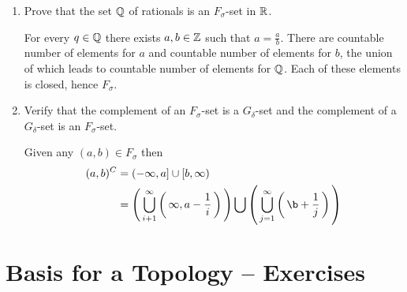 \documentclass[10pt,a4paper]{report}
\begin{document}
\begin{enumerate}
\begin{enumerate}[label=(\roman*)]
	\item Prove that the set $\mathbb{Q}$ of rationals is an $F_\sigma$-set in $\mathbb{R}$.  
	
	For every $q \in \mathbb{Q}$ there exists $a,b \in \mathbb{Z}$ such that $a = \frac{a}{b}$.  There are countable number of elements for $a$ and countable number of elements for $b$, the union of which leads to countable number of elements for $\mathbb{Q}$.  Each of these elements is closed, hence $F_\sigma$.
	
	\item Verify that the complement of an $F_\sigma$-set is a $G_\delta$-set and the complement of a $G_\delta$-set is an $F_\sigma$-set.
	
	Given any $(a,b) \in F_\sigma$ then 
	\begin{align*}
		(a,b)^C &= (-\infty, a] \cup [b, \infty) \\
		&= \PAREN{\bigcup_{i+1}^\infty \PAREN{\infty, a-\frac{1}{i}}} \bigcup \PAREN{\bigcup_{j=1}^\infty \PAREN{\b+\frac{1}{j}}}
	\end{align*}
	

\end{enumerate}

\end{enumerate}  %

\newpage
\section{Basis for a Topology -- Exercises}
\end{document}
